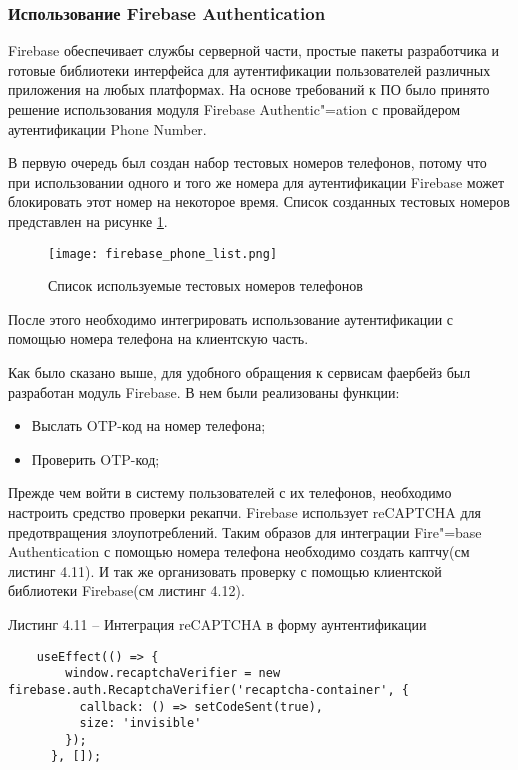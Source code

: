 \subsubsection{Использование Firebase Authentication}\hfill

Firebase обеспечивает службы серверной части, простые пакеты разработчика и готовые библиотеки интерфейса для аутентификации пользователей различных приложения на любых платформах.
На основе требований к ПО было принято решение использования модуля Firebase Authentic"=ation с провайдером аутентификации Phone Number.

В первую очередь был создан набор тестовых номеров телефонов, потому что при использовании одного и того же номера для аутентификации Firebase может блокировать этот номер на некоторое время.
Список созданных тестовых номеров представлен на рисунке \ref{fire:phones}.
\begin{figure}[ht]
    \centering
    \texttt{[image: firebase\_phone\_list.png]}
    \caption{ Список используемые тестовых номеров телефонов }
    \label{fire:phones}
\end{figure}

После этого необходимо интегрировать использование аутентификации с помощью номера телефона на клиентскую часть.

Как было сказано выше, для удобного обращения к сервисам фаербейз был разработан модуль Firebase.
В нем были реализованы функции:
\begin{itemize}
    \item Выслать OTP-код на номер телефона;
    \item Проверить OTP-код;
\end{itemize}

Прежде чем войти в систему пользователей с их телефонов, необходимо настроить средство проверки рекапчи.
Firebase использует reCAPTCHA для предотвращения злоупотреблений.
Таким образов для интеграции Fire"=base Authentication с помощью номера телефона необходимо создать каптчу(см листинг 4.11).
И так же организовать проверку с помощью клиентской библиотеки Firebase(см листинг 4.12).


Листинг 4.11 – Интеграция reCAPTCHA в форму аунтентификации
\begin{lstlisting}
    useEffect(() => {
        window.recaptchaVerifier = new firebase.auth.RecaptchaVerifier('recaptcha-container', {
          callback: () => setCodeSent(true),
          size: 'invisible'
        });
      }, []);
\end{lstlisting}

